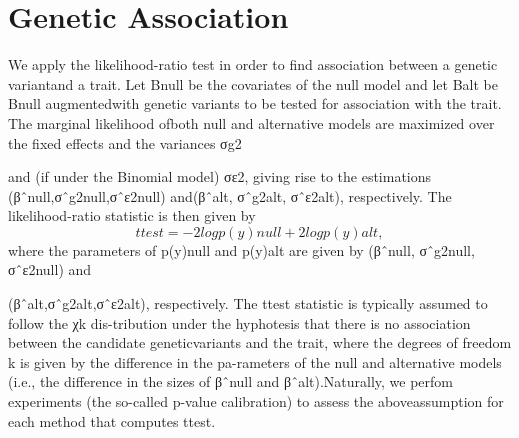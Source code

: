 \section{Genetic Association}

We apply the likelihood-ratio test in order to find association between a genetic variantand a trait. Let Bnull be the covariates of the null model and let Balt be Bnull augmentedwith genetic variants to be tested for association with the trait. The marginal likelihood ofboth null and alternative models are maximized over the fixed effects and the variances σg2

and (if under the Binomial model) σε2, giving rise to the estimations (βˆnull,σˆg2null,σˆε2null) and(βˆalt, σˆg2alt, σˆε2alt), respectively. The likelihood-ratio statistic is then given by
$$
ttest = −2 log p(y)null + 2 log p(y)alt,
$$
where the parameters of p(y)null and p(y)alt are given by (βˆnull, σˆg2null, σˆε2null) and

(βˆalt,σˆg2alt,σˆε2alt), respectively. The ttest statistic is typically assumed to follow the χk dis-tribution under the hyphotesis that there is no association between the candidate geneticvariants and the trait, where the degrees of freedom k is given by the difference in the pa-rameters of the null and alternative models (i.e., the difference in the sizes of βˆnull and βˆalt).Naturally, we perfom experiments (the so-called p-value calibration) to assess the aboveassumption for each method that computes ttest.
